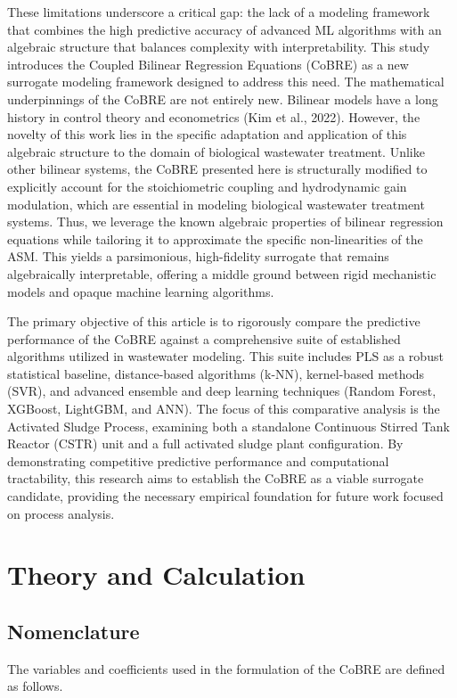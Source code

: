 \documentclass{article}
\begin{document}
These limitations underscore a critical gap: the lack of a modeling framework that combines the high predictive accuracy of advanced ML algorithms with an algebraic structure that balances complexity with interpretability. This study introduces the Coupled Bilinear Regression Equations (CoBRE) as a new surrogate modeling framework designed to address this need. The mathematical underpinnings of the CoBRE are not entirely new. Bilinear models have a long history in control theory and econometrics (Kim et al., 2022). However, the novelty of this work lies in the specific adaptation and application of this algebraic structure to the domain of biological wastewater treatment. Unlike other bilinear systems, the CoBRE presented here is structurally modified to explicitly account for the stoichiometric coupling and hydrodynamic gain modulation, which are essential in modeling biological wastewater treatment systems. Thus, we leverage the known algebraic properties of bilinear regression equations while tailoring it to approximate the specific non-linearities of the ASM. This yields a parsimonious, high-fidelity surrogate that remains algebraically interpretable, offering a middle ground between rigid mechanistic models and opaque machine learning algorithms.

The primary objective of this article is to rigorously compare the predictive performance of the CoBRE against a comprehensive suite of established algorithms utilized in wastewater modeling. This suite includes PLS as a robust statistical baseline, distance-based algorithms (k-NN), kernel-based methods (SVR), and advanced ensemble and deep learning techniques (Random Forest, XGBoost, LightGBM, and ANN). The focus of this comparative analysis is the Activated Sludge Process, examining both a standalone Continuous Stirred Tank Reactor (CSTR) unit and a full activated sludge plant configuration. By demonstrating competitive predictive performance and computational tractability, this research aims to establish the CoBRE as a viable surrogate candidate, providing the necessary empirical foundation for future work focused on process analysis.

\section{Theory and Calculation}
\subsection{Nomenclature}
The variables and coefficients used in the formulation of the CoBRE are defined as follows.
\end{document}
